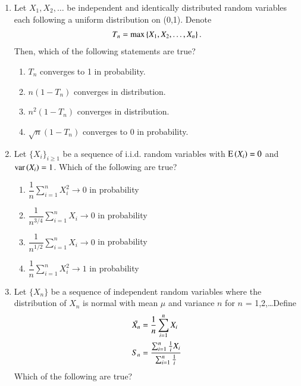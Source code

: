 \renewcommand{\theequation}{\theenumi}
\renewcommand{\thefigure}{\theenumi}
\renewcommand{\thetable}{\theenumi}
\begin{enumerate}[label=\thesection.\arabic*.,ref=\thesection.\theenumi]
%
\item 
Let $X_{1},X_{2},\dots$ be independent and identically distributed random variables each following a uniform distribution on (0,1). Denote 
\begin{align}
T_{n}=\max\left\{ X_{1},X_{2},\dots,X_{n}\right\}. 
\end{align}
Then, which of the following statements are true?
\begin{enumerate}
    \item $T_{n}$ converges to 1 in probability.
    \item $n(1-T_{n})$ converges in distribution.
    \item $n^{2}(1-T_{n})$ converges in distribution.
    \item $\sqrt{n}(1-T_{n})$ converges to 0 in probability.
\end{enumerate}
%
\solution

%
\item Let $\{X_i\}_{i \geq 1}$ be a sequence of i.i.d. random variables with $\text{E}\left( X_i \right)=0$ and $\text{var}\left( X_i \right)=1$. Which of the following are true?
%
\begin{enumerate}
    \setlength{\itemsep}{2pt}
    \item $\dfrac{1}{n} \sum_{i=1}^n X_i^2 \to 0$ in probability 
    \item $\dfrac{1}{n^{3/4}} \sum_{i=1}^n X_i \to 0$ in probability 
    \item $\dfrac{1}{n^{1/2}} \sum_{i=1}^n X_i \to 0$ in probability 
    \item $\dfrac{1}{n} \sum_{i=1}^n X_i^2 \to 1$ in probability
\end{enumerate}
%
\solution

%
\item Let $\{X_{n}\}$ be a sequence of independent random variables where the distribution of $X_{n}$ is normal with mean $\mu$ and variance $n$ for $n$ = 1,2,\dots Define
\begin{align}
    \Bar{X_{n}}&=\frac{1}{n}\sum_{i=1}^{n}X_{i}\\ S_{n}&=\frac{\sum_{i=1}^{n}\frac{1}{i}X_{i}}{\sum_{i=1}^{n}\frac{1}{i}}
\end{align}
Which of the following are true?
\begin{enumerate}

\end{enumerate}
\end{enumerate}
